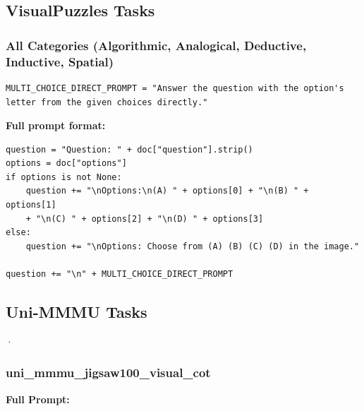 \documentclass{article}
\theoremstyle{plain}
\theoremstyle{definition}
\theoremstyle{remark}
\begin{document}
\subsection{VisualPuzzles Tasks}

\subsubsection{All Categories (Algorithmic, Analogical, Deductive, Inductive, Spatial)}

\begin{verbatim}
MULTI_CHOICE_DIRECT_PROMPT = "Answer the question with the option's
letter from the given choices directly."
\end{verbatim}

\textbf{Full prompt format:}

\begin{verbatim}
question = "Question: " + doc["question"].strip()
options = doc["options"]
if options is not None:
    question += "\nOptions:\n(A) " + options[0] + "\n(B) " + options[1]
    + "\n(C) " + options[2] + "\n(D) " + options[3]
else:
    question += "\nOptions: Choose from (A) (B) (C) (D) in the image."

question += "\n" + MULTI_CHOICE_DIRECT_PROMPT
\end{verbatim}

\subsection{Uni-MMMU Tasks}

·\subsubsection{uni\_mmmu\_jigsaw100\_visual\_cot}

\textbf{Full Prompt:}
\end{document}
